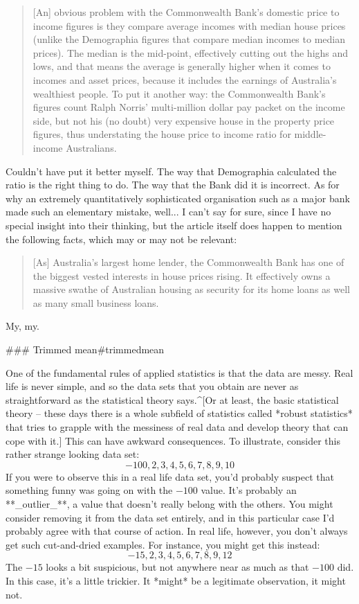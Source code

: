\begin{quote}
[An] obvious problem with the Commonwealth Bank's domestic price to income figures is they compare average incomes with median house prices (unlike the Demographia figures that compare median incomes to median prices). The median is the mid-point, effectively cutting out the highs and lows, and that means the average is generally higher when it comes to incomes and asset prices, because it includes the earnings of Australia's wealthiest people. To put it another way: the Commonwealth Bank's figures count Ralph Norris' multi-million dollar pay packet on the income side, but not his (no doubt) very expensive house in the property price figures, thus understating the house price to income ratio for middle-income Australians.
\end{quote}
Couldn't have put it better myself. The way that Demographia calculated the ratio is the right thing to do. The way that the Bank did it is incorrect. As for why an extremely quantitatively sophisticated organisation such as a major bank made such an elementary mistake, well... I can't say for sure, since I have no special insight into their thinking, but the article itself does happen to mention the following facts, which may or may not be relevant:
\begin{quote}
[As] Australia's largest home lender, the Commonwealth Bank has one of the biggest vested interests in house prices rising. It effectively owns a massive swathe of Australian housing as security for its home loans as well as many small business loans.
\end{quote}
My, my. 





### Trimmed mean{#trimmedmean} 

One of the fundamental rules of applied statistics is that the data are messy. Real life is never simple, and so the data sets that you obtain are never as straightforward as the statistical theory says.^[Or at least, the basic statistical theory -- these days there is a whole subfield of statistics called *robust statistics* that tries to grapple with the messiness of real data and develop theory that can cope with it.] This can have awkward consequences. To illustrate, consider this rather strange looking data set:
$$
-100,2,3,4,5,6,7,8,9,10
$$
If you were to observe this in a real life data set, you'd probably suspect that something funny was going on with the $-100$ value. It's probably an **_outlier_**, a value that doesn't really belong with the others. You might consider removing it from the data set entirely, and in this particular case I'd probably agree with that course of action. In real life, however, you don't always get such cut-and-dried examples. For instance, you might get this instead:
$$
-15,2,3,4,5,6,7,8,9,12
$$
The $-15$ looks a bit suspicious, but not anywhere near as much as that $-100$ did. In this case, it's a little trickier. It *might* be a legitimate observation, it might not.

